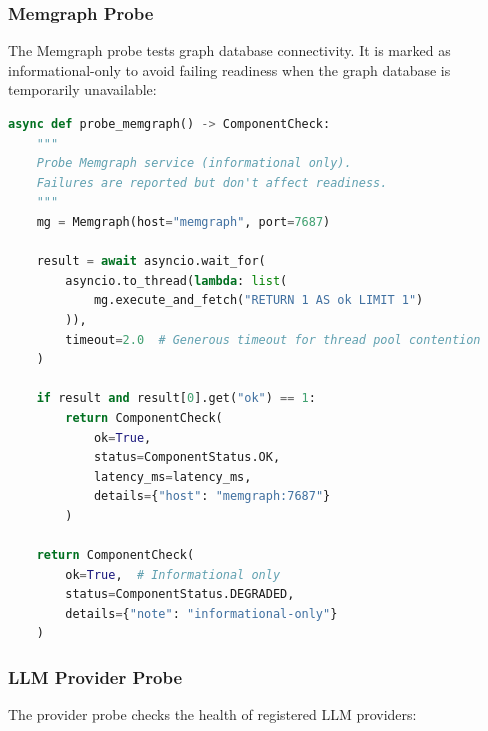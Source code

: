 \subsubsection{Memgraph Probe}

The Memgraph probe tests graph database connectivity. It is marked as informational-only to avoid failing readiness when the graph database is temporarily unavailable:

\begin{lstlisting}[language=Python, caption={Memgraph health probe (informational)}]
async def probe_memgraph() -> ComponentCheck:
    """
    Probe Memgraph service (informational only).
    Failures are reported but don't affect readiness.
    """
    mg = Memgraph(host="memgraph", port=7687)
    
    result = await asyncio.wait_for(
        asyncio.to_thread(lambda: list(
            mg.execute_and_fetch("RETURN 1 AS ok LIMIT 1")
        )),
        timeout=2.0  # Generous timeout for thread pool contention
    )
    
    if result and result[0].get("ok") == 1:
        return ComponentCheck(
            ok=True,
            status=ComponentStatus.OK,
            latency_ms=latency_ms,
            details={"host": "memgraph:7687"}
        )
    
    return ComponentCheck(
        ok=True,  # Informational only
        status=ComponentStatus.DEGRADED,
        details={"note": "informational-only"}
    )
\end{lstlisting}

\subsubsection{LLM Provider Probe}

The provider probe checks the health of registered LLM providers:

